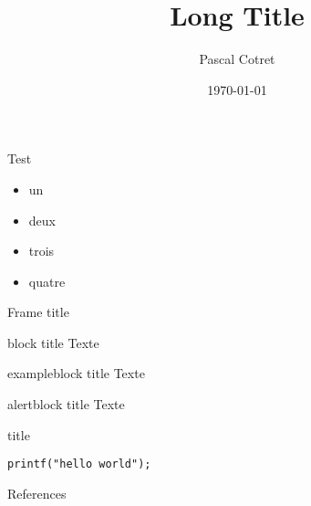 \documentclass{beamer}					%
\title[Short Title]{Long Title}
\author[Pascal]{Pascal Cotret}
\institute[ENSTA-B]{ENSTA Bretagne}
\date{\today}
\begin{document}
	\begin{frame}[plain]
		\titlepage\nocite{wahab:hal-01558155}
	\end{frame}

	\begin{frame}{Test}
		\begin{itemize}
			\item un
			\item deux
			\item trois
			\item quatre
		\end{itemize}
	\end{frame}
	
		\begin{frame}{Frame title}
		\begin{block}{block title}
			Texte
		\end{block}
	\begin{exampleblock}{exampleblock title}
	Texte
\end{exampleblock}
\begin{alertblock}{alertblock title}
Texte
\end{alertblock}
	\end{frame}
	\begin{frame}[fragile]{title}
		\begin{lstlisting}[style=customc]
printf("hello world");
		\end{lstlisting}
	\end{frame}
	\begin{frame}{References}
		\printbibliography
	\end{frame}
\end{document}
